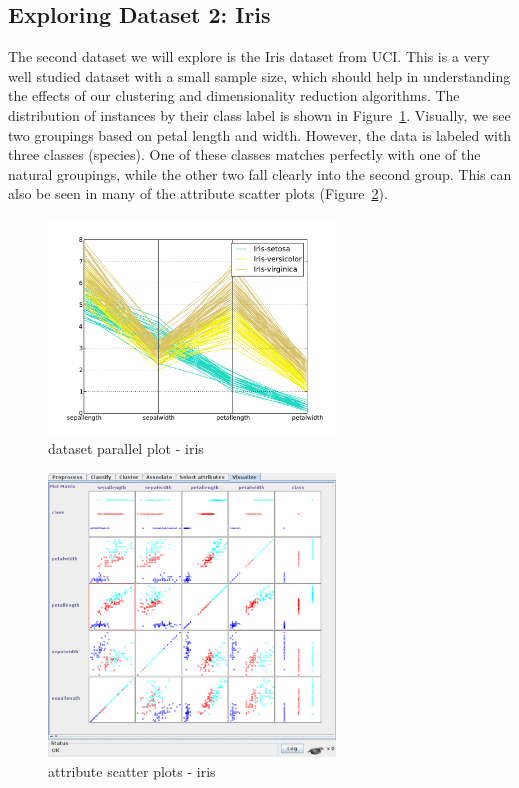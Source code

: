 \documentclass{sig-alternate}
\begin{document}



\subsection{Exploring Dataset 2: Iris}

The second dataset we will explore is the Iris dataset from UCI. This is a very well studied dataset with a small sample size, which should help in understanding the effects of our clustering and dimensionality reduction algorithms. The distribution of instances by their class label is shown in Figure~\ref{iris-parallel-class}. Visually, we see two groupings based on petal length and width. However, the data is labeled with three classes (species). One of these classes matches perfectly with one of the natural groupings, while the other two fall clearly into the second group. This can also be seen in many of the attribute scatter plots (Figure~\ref{iris-attr-scatter}).

\begin{figure}[!htbp]
    \centering
    \includegraphics[width=3in]{part2/iris/parallel-class.pdf}
    \caption{dataset parallel plot - iris\label{iris-parallel-class}}
\end{figure} 

\begin{figure}[!htbp]
    \centering
    \includegraphics[width=3in]{part2/iris/attribute-scatter.pdf}
    \caption{attribute scatter plots - iris\label{iris-attr-scatter}}
\end{figure} 
\end{document}
